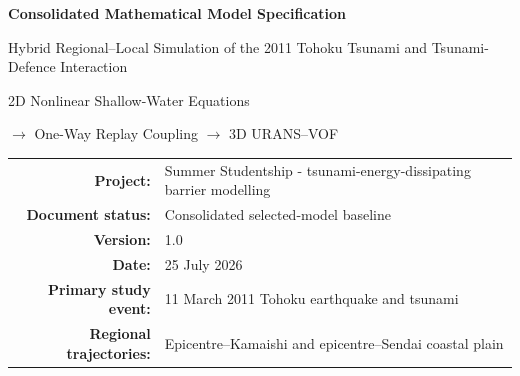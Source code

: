 \documentclass[11pt,a4paper]{article}
\begin{document}
\begin{titlepage}
\centering
\vspace*{18mm}
{\Huge\bfseries Consolidated Mathematical Model Specification\par}
\vspace{4mm}
{\LARGE Hybrid Regional--Local Simulation of the 2011 Tohoku Tsunami and Tsunami-Defence Interaction\par}
\vspace{10mm}
{\Large 2D Nonlinear Shallow-Water Equations\par}
{\Large $\longrightarrow$ One-Way Replay Coupling $\longrightarrow$ 3D URANS--VOF\par}
\vspace{15mm}
\begin{tabular}{rl}
\textbf{Project:} & Summer Studentship - tsunami-energy-dissipating barrier modelling\\
\textbf{Document status:} & Consolidated selected-model baseline\\
\textbf{Version:} & 1.0\\
\textbf{Date:} & 25 July 2026\\
\textbf{Primary study event:} & 11 March 2011 Tohoku earthquake and tsunami\\
\textbf{Regional trajectories:} & Epicentre--Kamaishi and epicentre--Sendai coastal plain\\
\end{tabular}
\vfill
{}
\vfill
\end{titlepage}
\end{document}
